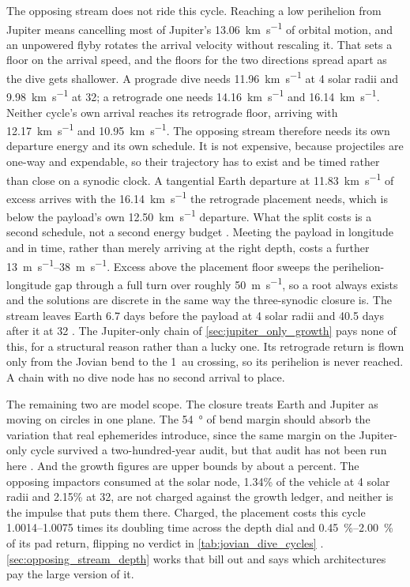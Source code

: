 \documentclass{article}
\begin{document}
The opposing stream does not ride this cycle. Reaching a low perihelion from Jupiter means cancelling most of Jupiter's \SI{13.06}{\kilo\meter\per\second} of orbital motion, and an unpowered flyby rotates the arrival velocity without rescaling it. That sets a floor on the arrival speed, and the floors for the two directions spread apart as the dive gets shallower. A prograde dive needs \SI{11.96}{\kilo\meter\per\second} at 4 solar radii and \SI{9.98}{\kilo\meter\per\second} at 32; a retrograde one needs \SI{14.16}{\kilo\meter\per\second} and \SI{16.14}{\kilo\meter\per\second}. Neither cycle's own arrival reaches its retrograde floor, arriving with \SI{12.17}{\kilo\meter\per\second} and \SI{10.95}{\kilo\meter\per\second}. The opposing stream therefore needs its own departure energy and its own schedule. It is not expensive, because projectiles are one-way and expendable, so their trajectory has to exist and be timed rather than close on a synodic clock. A tangential Earth departure at \SI{11.83}{\kilo\meter\per\second} of excess arrives with the \SI{16.14}{\kilo\meter\per\second} the retrograde placement needs, which is below the payload's own \SI{12.50}{\kilo\meter\per\second} departure. What the split costs is a second schedule, not a second energy budget \cite{Katz_aim_is_all_you_need_2025}. Meeting the payload in longitude and in time, rather than merely arriving at the right depth, costs a further \SIrange{13}{38}{\meter\per\second}. Excess above the placement floor sweeps the perihelion-longitude gap through a full turn over roughly \SI{50}{\meter\per\second}, so a root always exists and the solutions are discrete in the same way the three-synodic closure is. The stream leaves Earth 6.7 days before the payload at 4 solar radii and 40.5 days after it at 32 \cite{Katz_aim_is_all_you_need_2025}. The Jupiter-only chain of \autoref{sec:jupiter_only_growth} pays none of this, for a structural reason rather than a lucky one. Its retrograde return is flown only from the Jovian bend to the \SI{1}{\astronomicalunit} crossing, so its perihelion is never reached. A chain with no dive node has no second arrival to place.

The remaining two are model scope. The closure treats Earth and Jupiter as moving on circles in one plane. The \SI{54}{\degree} of bend margin should absorb the variation that real ephemerides introduce, since the same margin on the Jupiter-only cycle survived a two-hundred-year audit, but that audit has not been run here \cite{Katz_aim_is_all_you_need_2025}. And the growth figures are upper bounds by about a percent. The opposing impactors consumed at the solar node, 1.34\% of the vehicle at 4 solar radii and 2.15\% at 32, are not charged against the growth ledger, and neither is the impulse that puts them there. Charged, the placement costs this cycle \numrange{1.0014}{1.0075} times its doubling time across the depth dial and \SIrange{0.45}{2.00}{\percent} of its pad return, flipping no verdict in \autoref{tab:jovian_dive_cycles} \cite{Katz_aim_is_all_you_need_2025}. \autoref{sec:opposing_stream_depth} works that bill out and says which architectures pay the large version of it.
\end{document}
